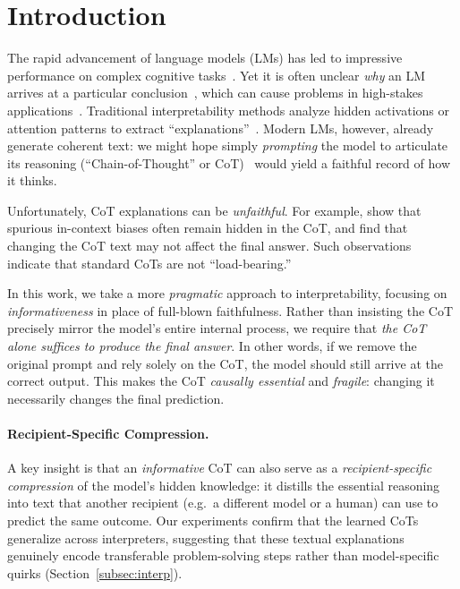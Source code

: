 \documentclass{article}
\theoremstyle{plain}
\theoremstyle{definition}
\theoremstyle{remark}
\begin{document}
\section{Introduction}
\label{sec:intro}
The rapid advancement of language models (LMs) has led to impressive performance on complex cognitive tasks~\citep{NEURIPS2020_1457c0d6}. Yet it is often unclear \emph{why} an LM arrives at a particular conclusion~\citep{lamparth2023analyzing,burns2024discovering,gurnee2024language}, which can cause problems in high-stakes applications~\citep{Grabb2024.04.07.24305462,lamparth2024human,rivera2024escalation}. Traditional interpretability methods analyze hidden activations or attention patterns to extract “explanations”~\citep{geiger2022inducing,geva2022transformer,meng2022locating,raukur2022toward,wang2022interpretability,lamparth2023analyzing,nanda2023progress}. Modern LMs, however, already generate coherent text: we might hope simply \emph{prompting} the model to articulate its reasoning (“Chain-of-Thought” or CoT)~\citep{nye2022show,wei2022chain} would yield a faithful record of how it thinks. 

Unfortunately, CoT explanations can be \emph{unfaithful}. For example, \citet{turpin2023language} show that spurious in-context biases often remain hidden in the CoT, and \citet{lanham2023measuring} find that changing the CoT text may not affect the final answer. Such observations indicate that standard CoTs are not “load-bearing.”

In this work, we take a more \emph{pragmatic} approach to interpretability, focusing on \emph{informativeness} in place of full-blown faithfulness. Rather than insisting the CoT precisely mirror the model's entire internal process, we require that \emph{the CoT alone suffices to produce the final answer}. In other words, if we remove the original prompt and rely solely on the CoT, the model should still arrive at the correct output. This makes the CoT \emph{causally essential} and \emph{fragile}: changing it necessarily changes the final prediction.

\paragraph{Recipient-Specific Compression.}
A key insight is that an \emph{informative} CoT can also serve as a \emph{recipient-specific compression} of the model's hidden knowledge: it distills the essential reasoning into text that another recipient (e.g.\ a different model or a human) can use to predict the same outcome. Our experiments confirm that the learned CoTs generalize across interpreters, suggesting that these textual explanations genuinely encode transferable problem-solving steps rather than model-specific quirks (Section~\ref{subsec:interp}).
\end{document}
